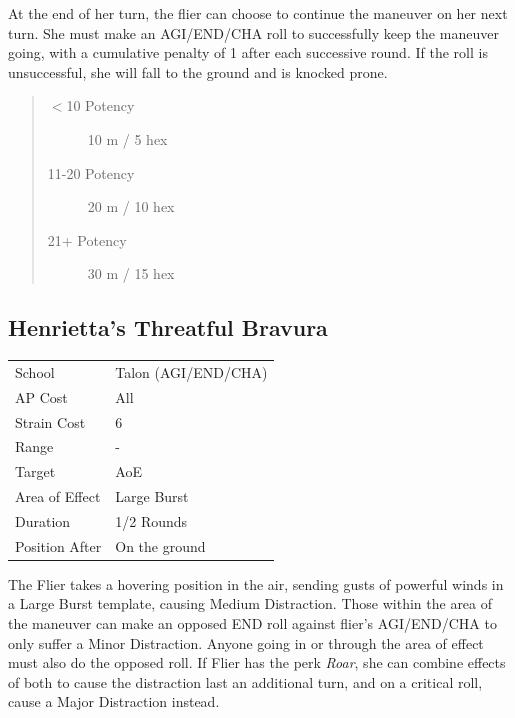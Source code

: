 \documentclass[11pt,a4paper,twocolumn]{book}
\begin{document}
At the end of her turn, the flier can choose to continue the maneuver on her next turn. She must make an AGI/END/CHA roll to successfully keep the maneuver going, with a cumulative penalty of 1 after each successive round. If the roll is unsuccessful, she will fall to the ground and is knocked prone.

\begin{quote}
	\begin{description}
		\item[$<$10 Potency] 	10 m / 5 hex
		\item[11-20 Potency] 	20 m / 10 hex
		\item[21+ Potency] 	30 m / 15 hex
	\end{description}
\end{quote}


\subsection*{Henrietta's Threatful Bravura}
{
	\begin{tabu} to 75mm{| X[l,4] | X[l,7] |}
		\hline
		School 			& Talon (AGI/END/CHA)			\\
        AP Cost	      	& All				\\
        Strain Cost     & 6 				\\
        Range     		& - 				\\
        Target      	& AoE 				\\
        Area of Effect  & Large Burst 	 	\\
        Duration     	& 1/2 Rounds	 			\\
		Position After  & On the ground 	\\ \hline
	\end{tabu}
		
}

\medskip

The Flier takes a hovering position in the air, sending gusts of powerful winds in a Large Burst template, causing Medium Distraction. Those within the area of the maneuver can make an opposed END roll against flier's AGI/END/CHA to only suffer a Minor Distraction. Anyone going in or through the area of effect must also do the opposed roll. If Flier has the perk \textit{Roar}, she can combine effects of both to cause the distraction last an additional turn, and on a critical roll, cause a Major Distraction instead. 
\end{document}
